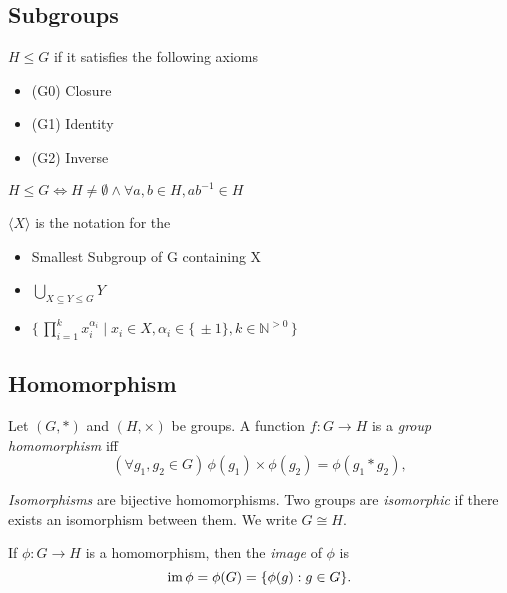 \documentclass[11pt]{scrartcl}
\newcommand\Set[2]{\{\,#1\mid#2\,\}}
\newcommand\setp[1]{\{\,#1\}}
\begin{document}
\subsection{Subgroups}
\begin{definitions}
$H \leq G$ if it satisfies the following axioms
\begin{itemize}
    \item (G0) Closure
    \item (G1) Identity
    \item (G2) Inverse
\end{itemize}
\end{definitions}
\begin{lemma}
$H \leq G \iff H\neq \emptyset 
\land \forall a,b \in H, ab^{-1}\in H $ 
\end{lemma}
\begin{definitions}
$\langle X \rangle$ is the notation for the 
\begin{itemize}
    \item Smallest Subgroup of G containing X
    \item $\bigcup_{X \subseteq Y \leq G} Y$
    \item $\Set{\prod_{i=1}^{k}x_{i}^{\alpha_{i}}}{x_{i}\in X, \alpha_{i} \in \setp{\pm 1}, k \in \mathbb{N}^{>0}}$
\end{itemize}
\end{definitions}

\subsection{Homomorphism}

\begin{definitions}
  Let $(G, *)$ and $(H, \times)$ be groups. A function $f:G\rightarrow H$ is a \emph{group homomorphism} iff
  \[
   ( \forall g_1, g_2 \in G)\, \phi(g_1)\times \phi(g_2) = \phi(g_1 * g_2),
  \]
\end{definitions}

\begin{definitions}
  \emph{Isomorphisms} are bijective homomorphisms. Two groups are \emph{isomorphic} if there exists an isomorphism between them. We write $G\cong H$.
\end{definitions}

\begin{definitions}
  If $\phi:G\rightarrow H$ is a homomorphism, then the \emph{image} of $\phi$ is
  \[
    \operatorname{im} \phi = \phi(G) = \{\phi(g):g\in G\}.
  \]
\end{definitions}
\end{document}
